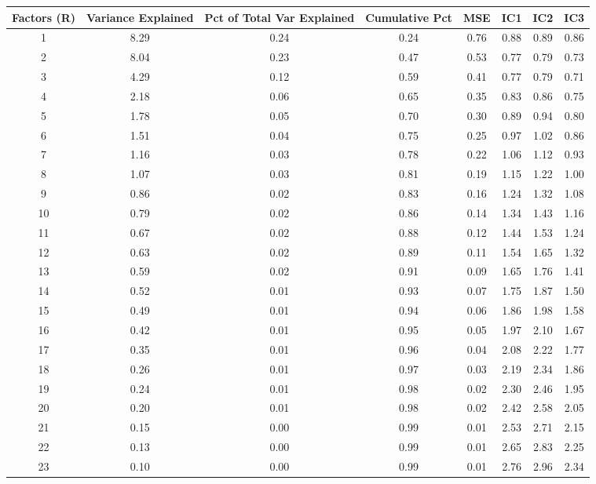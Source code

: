 \documentclass[11pt, letterpaper]{article}\usepackage[]{graphicx}\usepackage[]{color}
\begin{document}
\begin{table}[H]
\centering
\begingroup\scriptsize
\begin{tabular}{cccccccc}
  \hline
Factors (R) & Variance Explained & Pct of Total Var Explained & Cumulative Pct & MSE & IC1 & IC2 & IC3 \\ 
  \hline
  1 & 8.29 & 0.24 & 0.24 & 0.76 & 0.88 & 0.89 & 0.86 \\ 
    2 & 8.04 & 0.23 & 0.47 & 0.53 & 0.77 & 0.79 & 0.73 \\ 
    3 & 4.29 & 0.12 & 0.59 & 0.41 & 0.77 & 0.79 & 0.71 \\ 
    4 & 2.18 & 0.06 & 0.65 & 0.35 & 0.83 & 0.86 & 0.75 \\ 
    5 & 1.78 & 0.05 & 0.70 & 0.30 & 0.89 & 0.94 & 0.80 \\ 
    6 & 1.51 & 0.04 & 0.75 & 0.25 & 0.97 & 1.02 & 0.86 \\ 
    7 & 1.16 & 0.03 & 0.78 & 0.22 & 1.06 & 1.12 & 0.93 \\ 
    8 & 1.07 & 0.03 & 0.81 & 0.19 & 1.15 & 1.22 & 1.00 \\ 
    9 & 0.86 & 0.02 & 0.83 & 0.16 & 1.24 & 1.32 & 1.08 \\ 
   10 & 0.79 & 0.02 & 0.86 & 0.14 & 1.34 & 1.43 & 1.16 \\ 
   11 & 0.67 & 0.02 & 0.88 & 0.12 & 1.44 & 1.53 & 1.24 \\ 
   12 & 0.63 & 0.02 & 0.89 & 0.11 & 1.54 & 1.65 & 1.32 \\ 
   13 & 0.59 & 0.02 & 0.91 & 0.09 & 1.65 & 1.76 & 1.41 \\ 
   14 & 0.52 & 0.01 & 0.93 & 0.07 & 1.75 & 1.87 & 1.50 \\ 
   15 & 0.49 & 0.01 & 0.94 & 0.06 & 1.86 & 1.98 & 1.58 \\ 
   16 & 0.42 & 0.01 & 0.95 & 0.05 & 1.97 & 2.10 & 1.67 \\ 
   17 & 0.35 & 0.01 & 0.96 & 0.04 & 2.08 & 2.22 & 1.77 \\ 
   18 & 0.26 & 0.01 & 0.97 & 0.03 & 2.19 & 2.34 & 1.86 \\ 
   19 & 0.24 & 0.01 & 0.98 & 0.02 & 2.30 & 2.46 & 1.95 \\ 
   20 & 0.20 & 0.01 & 0.98 & 0.02 & 2.42 & 2.58 & 2.05 \\ 
   21 & 0.15 & 0.00 & 0.99 & 0.01 & 2.53 & 2.71 & 2.15 \\ 
   22 & 0.13 & 0.00 & 0.99 & 0.01 & 2.65 & 2.83 & 2.25 \\ 
   23 & 0.10 & 0.00 & 0.99 & 0.01 & 2.76 & 2.96 & 2.34 \\ 

\end{tabular}
\end{table}
\end{document}
